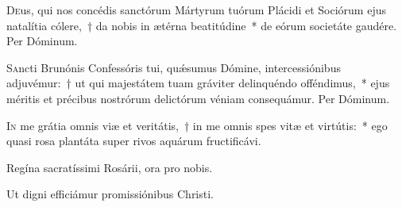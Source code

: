 \documentclass[vesperale_romanum.tex]{subfiles}
\begin{document}
\lettrine{D}{e}us, qui nos concédis san\-ctórum Mártyrum tuórum Plácidi et Sociórum ejus natalítia cólere,~† da nobis in ætérna beatitúdine~* de eórum societáte gaudére.
Per Dóminum.

\myrule


\duplex


\oratio

\lettrine{S}{a}ncti Brunónis Confessóris tui, quǽsumus Dómine, intercessiónibus adjuvémur:~† ut qui majestátem tuam gráviter delinquéndo offéndimus,~* ejus méritis et précibus nostrórum delictórum véniam consequámur. Per Dóminum.

\vespsequentiscomm

\myrule

\newpage







%

\label{112_6_alt_15_sept}
{}
%

%
%


\lettrine{I}{n} me grátia omnis viæ et veritátis,~† in me omnis spes vitæ et virtútis:~* ego quasi rosa plantáta super rivos aquárum fru\-ctificávi.

\hymnus


\vv Regína sacratíssimi Rosárii, ora pro nobis.

\rr Ut digni efficiámur promissiónibus Christi.
\end{document}
